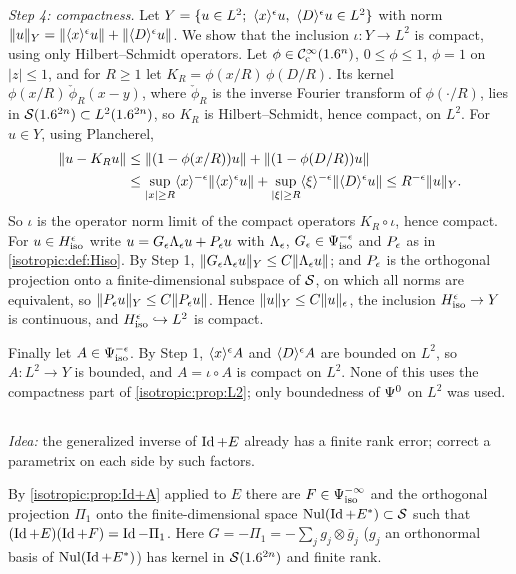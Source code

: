 \emph{Step 4: compactness.} Let $Y=\{u\in L^2;\ \langle x\rangle^\epsilon u,\ \langle D\rangle^\epsilon u\in L^2\}$
with norm $\lVert u\rVert_Y=\lVert \langle x\rangle^\epsilon u\rVert+\lVert \langle D\rangle^\epsilon u\rVert$. We show that the
inclusion $\iota:Y\to L^2$ is compact, using only Hilbert--Schmidt operators.
Let $\phi\in\mathcal{C}^\infty_{\mathrm{c}}(1.6^n)$, $0\le\phi\le1$, $\phi=1$ on $|z|\le1$, and for $R\ge1$ let
$K_R=\phi(x/R)\,\phi(D/R)$. Its kernel $\phi(x/R)\,\check\phi_R(x-y)$, where
$\check\phi_R$ is the inverse Fourier transform of $\phi(\cdot/R)$, lies in
$\mathcal{S}(1.6^{2n})\subset L^2(1.6^{2n})$, so $K_R$ is Hilbert--Schmidt, hence compact,
on $L^2$. For $u\in Y$, using Plancherel,
\begin{equation*}
\begin{aligned}
  \lVert u-K_Ru\rVert&\le\lVert (1-\phi(x/R))u\rVert+\lVert (1-\phi(D/R))u\rVert\\
  &\le\sup_{|x|\ge R}\langle x\rangle^{-\epsilon}\lVert \langle x\rangle^\epsilon u\rVert+\sup_{|\xi|\ge R}\langle \xi\rangle^{-\epsilon}\lVert \langle D\rangle^\epsilon u\rVert
  \le R^{-\epsilon}\lVert u\rVert_Y .
\end{aligned}
\end{equation*}
So $\iota$ is the operator norm limit of the compact operators $K_R\circ\iota$,
hence compact. For $u\in H^{\epsilon}_{\mathrm{iso}}$ write $u=G_\epsilon\Lambda_\epsilon u+P_\epsilon u$ with $\Lambda_\epsilon$,
$G_\epsilon\in\Psi^{-\epsilon}_{\mathrm{iso}}$ and $P_\epsilon$ as in \cref{isotropic:def:Hiso}. By Step 1,
$\lVert G_\epsilon\Lambda_\epsilon u\rVert_Y\le C\lVert \Lambda_\epsilon u\rVert$; and $P_\epsilon$ is the
orthogonal projection onto a finite-dimensional subspace of $\mathcal{S}$, on which all
norms are equivalent, so $\lVert P_\epsilon u\rVert_Y\le C\lVert P_\epsilon u\rVert$. Hence
$\lVert u\rVert_Y\le C\lVert u\rVert_\epsilon$, the inclusion $H^{\epsilon}_{\mathrm{iso}}\to Y$ is continuous, and
$H^{\epsilon}_{\mathrm{iso}}\hookrightarrow L^2$ is compact.

Finally let $A\in\Psi^{-\epsilon}_{\mathrm{iso}}$. By Step 1, $\langle x\rangle^\epsilon A$ and $\langle D\rangle^\epsilon A$
are bounded on $L^2$, so $A:L^2\to Y$ is bounded, and $A=\iota\circ A$ is
compact on $L^2$. None of this uses the compactness part of
\cref{isotropic:prop:L2}; only boundedness of $\Psi^{0}$ on $L^2$ was used.

\subsection*{}

\emph{Idea:} the generalized inverse of $\operatorname{Id}+E$ already has a finite rank
error; correct a parametrix on each side by such factors.

By \cref{isotropic:prop:Id+A} applied to $E$ there are $F\in\Psi^{-\infty}_{\mathrm{iso}}$
and the orthogonal projection $\Pi_1$ onto the finite-dimensional space
$\operatorname{Nul}(\operatorname{Id}+E^*)\subset\mathcal{S}$ such that $(\operatorname{Id}+E)(\operatorname{Id}+F)=\operatorname{Id}-\Pi_1$. Here
$G=-\Pi_1=-\sum_jg_j\otimes\bar g_j$ ($g_j$ an orthonormal basis of
$\operatorname{Nul}(\operatorname{Id}+E^*)$) has kernel in $\mathcal{S}(1.6^{2n})$ and finite rank.

